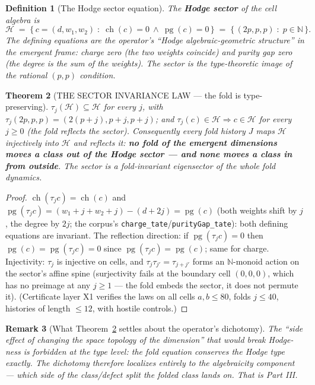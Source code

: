 \documentclass[11pt]{article}
\newtheorem{theorem}{Theorem}[section]
\newtheorem{definition}[theorem]{Definition}
\newtheorem{remark}[theorem]{Remark}
\begin{document}
\begin{definition}[The Hodge sector equation]
\label{def:sector}
The \textbf{Hodge sector} of the cell algebra is
\[
\mathcal{H} \;=\; \{\, c=(d,w_1,w_2) \;:\; \operatorname{ch}(c)=0 \ \wedge\ \operatorname{pg}(c)=0 \,\}
 \;=\; \{\, (2p,p,p) \;:\; p\in\mathbb{N} \,\}.
\]
The defining equations \emph{are} the operator's ``Hodge algebraic-geometric structure'' in the emergent frame: charge zero (the two weights coincide) and purity gap zero (the degree is the sum of the weights). The sector is the type-theoretic image of the rational $(p,p)$ condition.
\end{definition}

\begin{theorem}[THE SECTOR INVARIANCE LAW — the fold is type-preserving]
\label{thm:sector}
$\tau_j(\mathcal{H})\subseteq\mathcal{H}$ for every $j$, with $\tau_j(2p,p,p)=(2(p+j),p+j,p+j)$; and $\tau_j(c)\in\mathcal{H}\Rightarrow c\in\mathcal{H}$ for every $j\ge 0$ (the fold reflects the sector). Consequently every fold history $J$ maps $\mathcal{H}$ \emph{injectively into} $\mathcal{H}$ and \emph{reflects} it: \textbf{no fold of the emergent dimensions moves a class out of the Hodge sector — and none moves a class in from outside}. The sector is a fold-invariant eigensector of the whole fold dynamics.
\end{theorem}

\begin{proof}
$\operatorname{ch}(\tau_j c)=\operatorname{ch}(c)$ and $\operatorname{pg}(\tau_j c)=(w_1+j+w_2+j)-(d+2j)=\operatorname{pg}(c)$ (both weights shift by $j$, the degree by $2j$; the corpus's \texttt{charge\_tate}/\texttt{purityGap\_tate}): both defining equations are invariant. The reflection direction: if $\operatorname{pg}(\tau_j c)=0$ then $\operatorname{pg}(c)=\operatorname{pg}(\tau_j c)=0$ since $\operatorname{pg}(\tau_j c)=\operatorname{pg}(c)$; same for charge. Injectivity: $\tau_j$ is injective on cells, and $\tau_j\tau_{j'}=\tau_{j+j'}$ forms an $\mathbb{N}$-monoid action on the sector's affine spine (surjectivity fails at the boundary cell $(0,0,0)$, which has no preimage at any $j\ge 1$ — the fold embeds the sector, it does not permute it). (Certificate layer X1 verifies the laws on all cells $a,b\le 80$, folds $j\le 40$, histories of length $\le 12$, with hostile controls.)
\end{proof}

\begin{remark}[What Theorem~\ref{thm:sector} settles about the operator's dichotomy]
The ``side effect of changing the space topology of the dimension'' that would \emph{break Hodge-ness} is forbidden \emph{at the type level}: the fold equation conserves the Hodge type exactly. The dichotomy therefore localizes entirely to the \emph{algebraicity} component — which side of the class/defect split the folded class lands on. That is Part III.
\end{remark}
\end{document}
